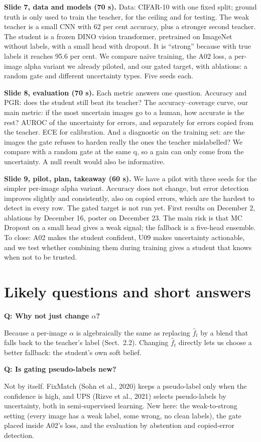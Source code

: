 \documentclass[10pt,a4paper]{article}
\newcommand{\fhat}{\hat f_t}
\newcommand{\Q}[1]{\par\medskip\noindent\textbf{Q: #1}\par\noindent}
\begin{document}
\textbf{Slide 7, data and models (70 s).} Data: CIFAR-10 with one fixed split; ground truth is only used to train
the teacher, for the ceiling and for testing. The weak teacher is a small CNN with 62 per cent accuracy, plus
a stronger second teacher. The student is a frozen DINO vision transformer, pretrained on ImageNet without
labels, with a small head with dropout. It is ``strong'' because with true labels it reaches 95.6 per cent. We
compare naive training, the A02 loss, a per-image alpha variant we already piloted, and our gated target, with
ablations: a random gate and different uncertainty types. Five seeds each.

\textbf{Slide 8, evaluation (70 s).} Each metric answers one question. Accuracy and PGR: does the student still
beat its teacher? The accuracy--coverage curve, our main metric: if the most uncertain images go to a human,
how accurate is the rest? AUROC of the uncertainty for errors, and separately for errors copied from the
teacher. ECE for calibration. And a diagnostic on the training set: are the images the gate refuses to harden
really the ones the teacher mislabelled? We compare with a random gate at the same q, so a gain can only come
from the uncertainty. A null result would also be informative.

\textbf{Slide 9, pilot, plan, takeaway (60 s).} We have a pilot with three seeds for the simpler per-image alpha
variant. Accuracy does not change, but error detection improves slightly and consistently, also on copied
errors, which are the hardest to detect in every row. The gated target is not run yet. First results on
December 2, ablations by December 16, poster on December 23. The main risk is that MC Dropout on a small head
gives a weak signal; the fallback is a five-head ensemble. To close: A02 makes the student confident, U09 makes
uncertainty actionable, and we test whether combining them during training gives a student that knows when
not to be trusted.

\section{Likely questions and short answers}
\Q{Why not just change $\alpha$?} Because a per-image $\alpha$ is algebraically the same as replacing $\fhat$ by
a blend that falls back to the teacher's label (Sect.\ 2.2). Changing $\fhat$ directly lets us choose a better
fallback: the student's own soft belief.

\Q{Is gating pseudo-labels new?} Not by itself. FixMatch (Sohn et al., 2020) keeps a pseudo-label only when the
confidence is high, and UPS (Rizve et al., 2021) selects pseudo-labels by uncertainty, both in semi-supervised
learning. New here: the weak-to-strong setting (every image has a weak label, some wrong, no clean labels), the
gate placed inside A02's loss, and the evaluation by abstention and copied-error detection.
\end{document}
